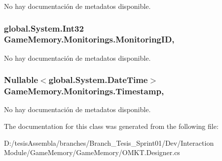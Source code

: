 No hay documentación de metadatos disponible. 

\hypertarget{class_game_memory_1_1_monitorings_a26160580b6c9b96a7773135cec3a0409}{
\subsubsection[{Monitoring\-I\-D}]{\setlength{\rightskip}{0pt plus 5cm}global.\-System.\-Int32 Game\-Memory.\-Monitorings.\-Monitoring\-I\-D\hspace{0.3cm}{\ttfamily [get]}, {\ttfamily [set]}}}\label{class_game_memory_1_1_monitorings_a26160580b6c9b96a7773135cec3a0409}


No hay documentación de metadatos disponible. 

\hypertarget{class_game_memory_1_1_monitorings_aa2aab4600abf54e97998d55a8c6a7520}{
\subsubsection[{Timestamp}]{\setlength{\rightskip}{0pt plus 5cm}Nullable$<$global.\-System.\-Date\-Time$>$ Game\-Memory.\-Monitorings.\-Timestamp\hspace{0.3cm}{\ttfamily [get]}, {\ttfamily [set]}}}\label{class_game_memory_1_1_monitorings_aa2aab4600abf54e97998d55a8c6a7520}


No hay documentación de metadatos disponible. 



The documentation for this class was generated from the following file\-:\begin{DoxyCompactItemize}
\item 
D\-:/tesis\-Assembla/branches/\-Branch\-\_\-\-Tesis\-\_\-\-Sprint01/\-Dev/\-Interaction Module/\-Game\-Memory/\-Game\-Memory/O\-M\-K\-T.\-Designer.\-cs\end{DoxyCompactItemize}
